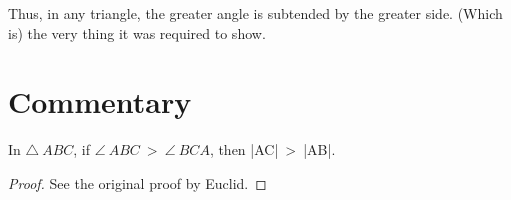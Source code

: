 Thus, in any triangle, the greater angle is subtended by the greater side.
(Which is) the very thing it was required to show.


\section*{Commentary}

\begin{proposition}\label{proposition_19}\leanok
    In $\triangle~ABC$, if $\angle~ABC~>~\angle~BCA$, then |AC|~>~|AB|.
\end{proposition}
\begin{proof}
    \leanok
    See the original proof by Euclid.
\end{proof}
